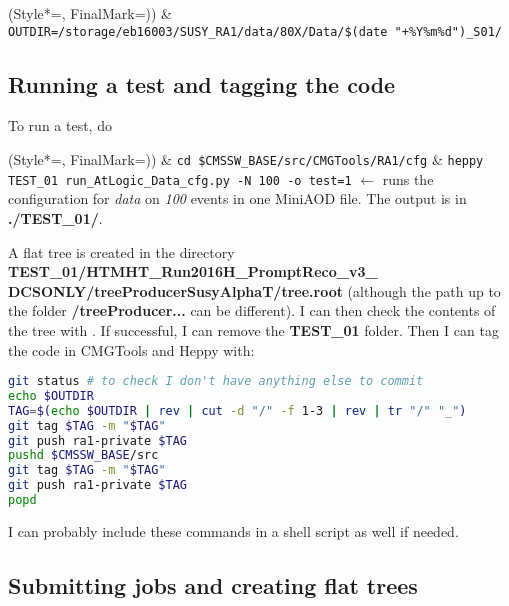 
\begin{easylist}
\ListProperties(Style*=, FinalMark={)})
& \texttt{OUTDIR=/storage/eb16003/SUSY\_RA1/data/80X/Data/\$(date "+\%Y\%m\%d")\_S01/}
\end{easylist}

\subsection{Running a test and tagging the code}

To run a test, do

\begin{easylist}
\ListProperties(Style*=, FinalMark={)})
& \verb!cd $CMSSW_BASE/src/CMGTools/RA1/cfg!
& \verb!heppy TEST_01 run_AtLogic_Data_cfg.py -N 100 -o test=1! $\leftarrow$ runs the configuration for \emph{data} on \emph{100} events in one MiniAOD file. The output is in \textbf{./TEST\_01/}.
\end{easylist}

A flat tree is created in the directory \textbf{TEST\_01/HTMHT\_Run2016H\_PromptReco\_v3\_
DCSONLY/treeProducerSusyAlphaT/tree.root} (although the path up to the folder \textbf{/treeProducer...} can be different). I can then check the contents of the tree with \ROOT. If successful, I can remove the \textbf{TEST\_01} folder. Then I can tag the code in CMGTools and Heppy with:

\begin{lstlisting}[belowskip=-0.7cm, language=sh, numbers=none]
git status # to check I don't have anything else to commit
echo $OUTDIR
TAG=$(echo $OUTDIR | rev | cut -d "/" -f 1-3 | rev | tr "/" "_")
git tag $TAG -m "$TAG"
git push ra1-private $TAG
pushd $CMSSW_BASE/src
git tag $TAG -m "$TAG"
git push ra1-private $TAG
popd
\end{lstlisting}

I can probably include these commands in a shell script as well if needed.

\subsection{Submitting jobs and creating flat trees}

